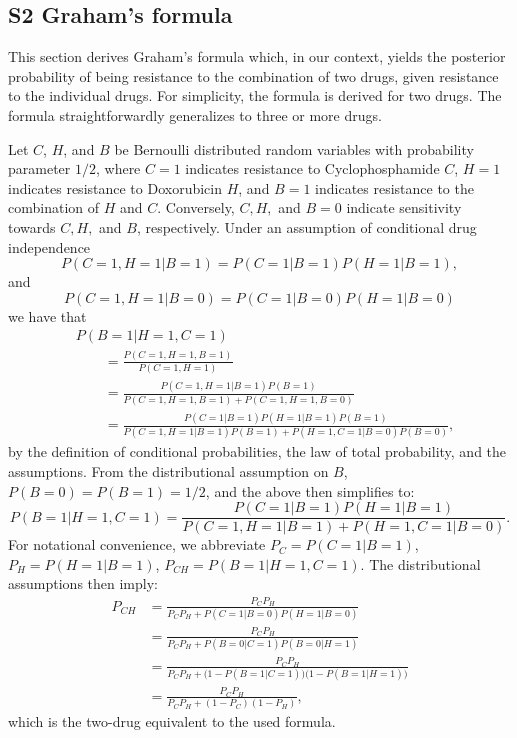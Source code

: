 \documentclass[10pt,letterpaper]{article}
\begin{document}




\clearpage



\subsection*{S2 Graham's formula}
\label{sec:graham}
This section derives Graham's formula which, in our context, yields the posterior probability of being resistance to the combination of two drugs, given resistance to the individual drugs. For simplicity, the formula is derived for two drugs. The formula straightforwardly generalizes to three or more drugs.

Let $C$, $H$, and $B$ be Bernoulli distributed random variables with probability parameter $1/2$, where $C = 1$ indicates resistance to Cyclophosphamide $C$, $H = 1$ indicates resistance to Doxorubicin $H$, and $B = 1$ indicates resistance to the combination of $H$ and $C$. Conversely, $C,H,$ and $B = 0$ indicate sensitivity towards $C,H,$ and $B$, respectively. Under an assumption of conditional drug independence 
\begin{equation*}
   P(C=1, H=1| B=1) = P(C=1 | B=1) P(H=1 | B=1),
\end{equation*}
and
\begin{equation*}
 P(C=1, H=1| B=0) = P(C=1 | B=0) P(H=1 | B=0)  
\end{equation*}
we have that
\begin{align*}
  &P(B=1 | H=1, C=1)
  \\&\qquad
   = \frac{P(C=1, H=1, B=1)}
          {P(C=1, H=1)}
  \\&\qquad
   = \frac{P(C=1, H=1 | B=1) P(B=1)}
          {P(C=1, H=1, B=1) + P(C=1, H=1, B=0)}
  \\&\qquad
   = \frac{P(C=1 | B=1) P(H=1 | B=1) P(B=1)}
          {P(C=1, H=1 | B=1) P(B=1) + P(H=1, C=1| B=0) P(B=0)},
\end{align*}
by the definition of conditional probabilities, the law of total probability, and the assumptions. From the distributional assumption on $B$, $P(B=0) = P(B=1) = 1/2$, and the above then simplifies to:
\begin{equation*}
  P(B=1 | H=1, C=1)
   = \frac{P(C=1 | B=1) P(H=1 | B=1)}
          {P(C=1, H=1 | B=1) + P(H=1, C=1 | B=0)}.
\end{equation*}
For notational convenience, we abbreviate $P_C = P(C=1 | B=1)$, $P_H = P(H=1 | B=1)$, $P_{CH} = P(B=1 | H=1, C=1)$. The distributional assumptions then imply:
\begin{align*}
  P_{CH}
  &= \frac{P_C P_H}
          {P_C P_H + P(C=1 | B=0) P(H=1 | B=0)}
  \\
  &= \frac{P_C P_H}
          {P_C P_H + P(B=0 | C=1) P(B=0 | H=1)}
  \\
  &= \frac{P_C P_H}
          {P_C P_H + \bigl(1 - P(B=1 | C=1)\bigr)\bigl(1 - P(B=1 | H=1)\bigr)}
  \\
  &= \frac{P_C P_H}
          {P_C P_H + (1 - P_C)(1 - P_H)},
\end{align*}
which is the two-drug equivalent to the used formula.
\end{document}
